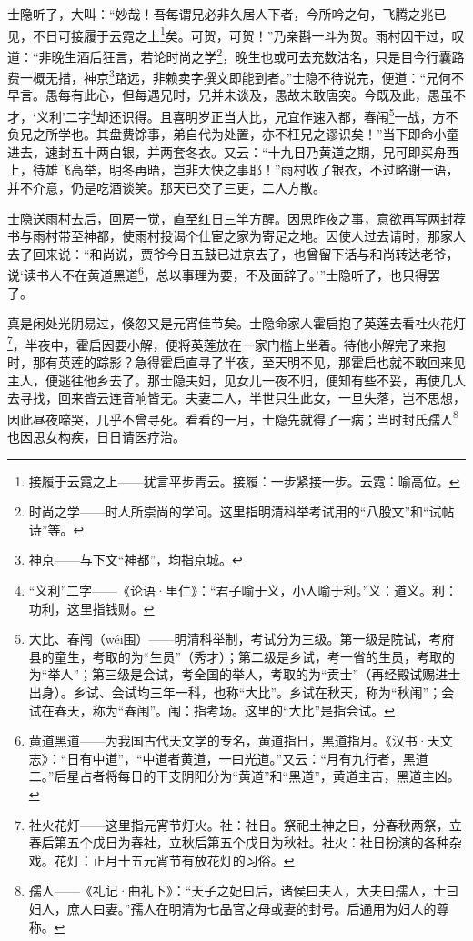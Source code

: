 \par 士隐听了，大叫：“妙哉！吾每谓兄必非久居人下者，今所吟之句，飞腾之兆已见，不日可接履于云霓之上\footnote{接履于云霓之上——犹言平步青云。接履：一步紧接一步。云霓：喻高位。}矣。可贺，可贺！”乃亲斟一斗为贺。雨村因干过，叹道：“非晚生酒后狂言，若论时尚之学\footnote{时尚之学——时人所崇尚的学问。这里指明清科举考试用的“八股文”和“试帖诗”等。}，晚生也或可去充数沽名，只是目今行囊路费一概无措，神京\footnote{神京——与下文“神都”，均指京城。}路远，非赖卖字撰文即能到者。”士隐不待说完，便道：“兄何不早言。愚每有此心，但每遇兄时，兄并未谈及，愚故未敢唐突。今既及此，愚虽不才，‘义利’二字\footnote{“义利”二字——《论语·里仁》：“君子喻于义，小人喻于利。”义：道义。利：功利，这里指钱财。}却还识得。且喜明岁正当大比，兄宜作速入都，春闱\footnote{大比、春闱（wéi围）——明清科举制，考试分为三级。第一级是院试，考府县的童生，考取的为“生员”（秀才）；第二级是乡试，考一省的生员，考取的为“举人”；第三级是会试，考全国的举人，考取的为“贡士”（再经殿试赐进士出身）。乡试、会试均三年一科，也称“大比”。乡试在秋天，称为“秋闱”；会试在春天，称为“春闱”。闱：指考场。这里的“大比”是指会试。}一战，方不负兄之所学也。其盘费馀事，弟自代为处置，亦不枉兄之谬识矣！”当下即命小童进去，速封五十两白银，并两套冬衣。又云：“十九日乃黄道之期，兄可即买舟西上，待雄飞高举，明冬再晤，岂非大快之事耶！”雨村收了银衣，不过略谢一语，并不介意，仍是吃酒谈笑。那天已交了三更，二人方散。
\par 士隐送雨村去后，回房一觉，直至红日三竿方醒。因思昨夜之事，意欲再写两封荐书与雨村带至神都，使雨村投谒个仕宦之家为寄足之地。因使人过去请时，那家人去了回来说：“和尚说，贾爷今日五鼓已进京去了，也曾留下话与和尚转达老爷，说‘读书人不在黄道黑道\footnote{黄道黑道——为我国古代天文学的专名，黄道指日，黑道指月。《汉书·天文志》：“日有中道”，“中道者黄道，一曰光道。”又云：“月有九行者，黑道二。”后星占者将每日的干支阴阳分为“黄道”和“黑道”，黄道主吉，黑道主凶。}，总以事理为要，不及面辞了。’”士隐听了，也只得罢了。
\par 真是闲处光阴易过，倏忽又是元宵佳节矣。士隐命家人霍启抱了英莲去看社火花灯\footnote{社火花灯——这里指元宵节灯火。社：社日。祭祀土神之日，分春秋两祭，立春后第五个戊日为春社，立秋后第五个戊日为秋社。社火：社日扮演的各种杂戏。花灯：正月十五元宵节有放花灯的习俗。}，半夜中，霍启因要小解，便将英莲放在一家门槛上坐着。待他小解完了来抱时，那有英莲的踪影？急得霍启直寻了半夜，至天明不见，那霍启也就不敢回来见主人，便逃往他乡去了。那士隐夫妇，见女儿一夜不归，便知有些不妥，再使几人去寻找，回来皆云连音响皆无。夫妻二人，半世只生此女，一旦失落，岂不思想，因此昼夜啼哭，几乎不曾寻死。看看的一月，士隐先就得了一病；当时封氏孺人\footnote{孺人——《礼记·曲礼下》：“天子之妃曰后，诸侯曰夫人，大夫曰孺人，士曰妇人，庶人曰妻。”孺人在明清为七品官之母或妻的封号。后通用为妇人的尊称。}也因思女构疾，日日请医疗治。
